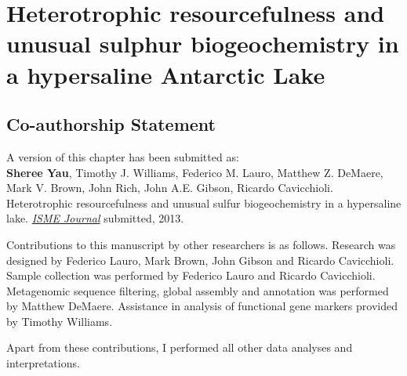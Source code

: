 \chapter[Organic Lake]{Heterotrophic resourcefulness and unusual sulphur biogeochemistry in a hypersaline Antarctic Lake}
\label{ch:org}
\acresetall

\section*{Co-authorship Statement}
A version of this chapter has been submitted as:\\

\textbf{Sheree Yau}, Timothy J. Williams, Federico M. Lauro,  Matthew Z. DeMaere, Mark V. Brown, John Rich, 
John A.E. Gibson, Ricardo Cavicchioli. 
Heterotrophic resourcefulness and unusual sulfur biogeochemistry in a hypersaline lake.
\emph{\underline{ISME Journal}}
submitted, 2013.

Contributions to this manuscript by other researchers is as follows.
Research was designed by Federico Lauro, Mark Brown, John Gibson and Ricardo Cavicchioli.
Sample collection was performed by Federico Lauro and Ricardo Cavicchioli.
Metagenomic sequence filtering, global assembly and annotation was performed by Matthew DeMaere.
Assistance in analysis of functional gene markers provided by Timothy Williams.

Apart from these contributions, I performed all other data analyses and interpretations.
\newpage


